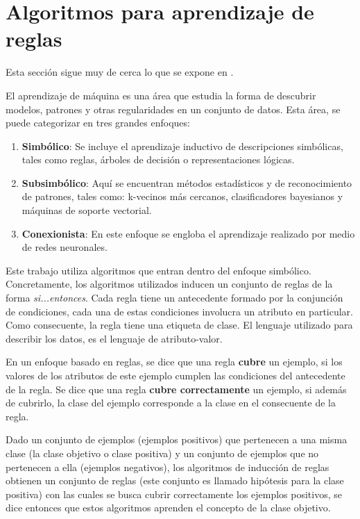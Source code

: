\documentclass[12pt]{report}
\theoremstyle{break}
\theoremstyle{break}
\begin{document}
\section{Algoritmos para aprendizaje de reglas}
\label{seccion:algoritmos-aprendizaje-reglas}
Esta sección sigue muy de cerca lo que se expone en \cite{foundations-rule}.

El aprendizaje de máquina es una área que estudia la forma de descubrir modelos, patrones y otras regularidades en un conjunto de datos. Esta área, se puede categorizar en tres grandes enfoques:

\begin{enumerate}
\item \textbf{Simbólico}: Se incluye el aprendizaje inductivo de descripciones simbólicas, tales como reglas, árboles de decisión o representaciones lógicas.

\item \textbf{Subsimbólico}: Aquí se encuentran métodos estadísticos y de reconocimiento de patrones, tales como: k-vecinos más cercanos, clasificadores bayesianos y máquinas de soporte vectorial.

\item \textbf{Conexionista}: En este enfoque se engloba el aprendizaje realizado por medio de redes neuronales.
\end{enumerate}

Este trabajo utiliza algoritmos que entran dentro del enfoque simbólico. Concretamente, los algoritmos utilizados inducen un conjunto de reglas de la forma \textit{si...entonces}. Cada regla tiene un antecedente formado por la conjunción de condiciones, cada una de estas condiciones involucra un atributo en particular. Como consecuente, la regla tiene una etiqueta de clase. El lenguaje utilizado para describir los datos, es el lenguaje de atributo-valor.

En un enfoque basado en reglas, se dice que una regla \textbf{cubre} un ejemplo, si los valores de los atributos de este ejemplo cumplen las condiciones del antecedente de la regla. Se dice que una regla \textbf{cubre correctamente} un ejemplo, si además de cubrirlo, la clase del ejemplo corresponde a la clase en el consecuente de la regla.

Dado un conjunto de ejemplos (ejemplos positivos) que pertenecen a una misma clase (la clase objetivo o clase positiva) y un conjunto de ejemplos que no pertenecen a ella (ejemplos negativos), los algoritmos de inducción de reglas obtienen un conjunto de reglas (este conjunto es llamado hipótesis para la clase positiva) con las cuales se busca cubrir correctamente los ejemplos positivos, se dice entonces que estos algoritmos aprenden el concepto de la clase objetivo.
\end{document}
